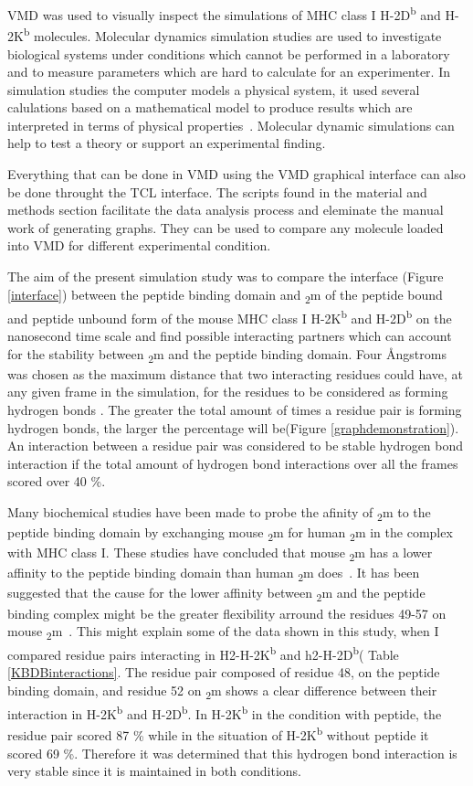 \documentclass[11pt,twocolumn]{article}
\newcommand{\db}{H-2D\textsuperscript{b}\xspace}
\newcommand{\kb}{H-2K\textsuperscript{b}\xspace}
\newcommand{\angstr}{{\AA}ngstroms\xspace}
\newcommand{\btm}{\textbeta\textsubscript{2}m\xspace}
\begin{document}
 VMD was used to visually inspect the simulations of MHC class I \db and \kb molecules. Molecular dynamics simulation studies are  used to investigate biological systems under conditions which cannot be performed in a laboratory and to  measure parameters which are hard to calculate for an experimenter. In simulation studies the computer models a physical system, it used several calulations based on a mathematical model to produce results which are interpreted in terms of physical properties~\cite{allen2004introduction}. Molecular dynamic simulations can help to test a theory or support an experimental finding.   

  
Everything that can be done in VMD using the VMD graphical interface can also be done throught the TCL interface. The scripts found in the material and methods section facilitate the data analysis process and eleminate the manual work of generating graphs. They can be used to compare any molecule loaded into VMD for different experimental condition.




The aim of the present simulation study was to compare the interface (Figure \ref{interface}) between the peptide binding domain and \btm of the peptide bound and peptide unbound form of the mouse MHC class I \kb and \db on the nanosecond time scale and find possible interacting partners which can account for the stability between \btm and the peptide binding domain. Four \angstr was chosen as the maximum distance that two interacting residues could have, at any given frame in the simulation, for the residues to be considered as forming hydrogen bonds \cite{McDonald1994777}. The greater the total amount of times a residue pair is forming hydrogen bonds, the larger the percentage will be(Figure \ref{graphdemonstration}). An interaction  between a residue pair was considered to be stable hydrogen bond interaction if the total amount of hydrogen bond interactions over all the frames scored over 40 \%. 

Many biochemical studies have been made to probe the afinity of \btm to the peptide binding domain by exchanging mouse \btm for human \btm in the complex with MHC class I. These studies have concluded that mouse \btm has a lower affinity to the peptide binding domain than human \btm does~\cite{Shields1999561}. It has been suggested that the cause for the lower affinity between \btm and the peptide binding complex might be the greater flexibility arround the residues 49-57 on mouse \btm~\cite{Shields1999561}. This might explain some of the data shown in this study, when I compared residue pairs interacting in H2-\kb and h2-\db ( Table \ref{KBDBinteractions}. The residue pair composed of residue 48, on the peptide binding domain, and residue 52 on \btm shows a clear difference between their interaction in \kb and \db. In \kb in the condition with peptide, the residue pair scored 87 \% while in the situation of \kb without peptide it scored 69 \%. Therefore it was determined that this hydrogen bond interaction is very stable since it is maintained in both conditions.
\end{document}
